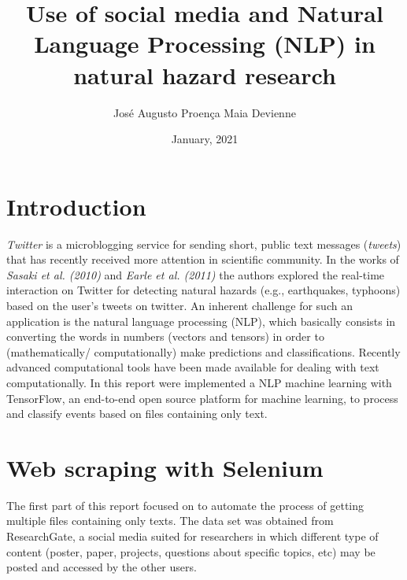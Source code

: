 \documentclass{article}
\title{Use of social media and Natural Language Processing (NLP) in natural hazard research}
\author{José Augusto Proença Maia Devienne}
\affil{Big Data to Earth Scientists}
\date{January, 2021}
\begin{document}
\maketitle

\section{Introduction}

\textit{Twitter} is a microblogging service for sending short, public text messages (\textit{tweets}) that has recently received more attention in scientific community. In the works of \textit{Sasaki et al. (2010)} and \textit{Earle et al. (2011)} the authors explored the real-time interaction on Twitter for detecting natural hazards (e.g., earthquakes, typhoons) based on the user's tweets on twitter. An inherent challenge for such an application is the natural language processing (NLP), which basically consists in converting the words in numbers (vectors and tensors) in order to (mathematically/ computationally) make predictions and classifications. Recently advanced computational tools have been made available for dealing with text computationally. In this report were implemented a NLP machine learning with TensorFlow, an end-to-end open source platform for machine learning,  to process and classify events based on files containing only text. 





\section{Web scraping with Selenium}

The first part of this report focused on to automate the process of getting multiple files containing only texts. The data set was obtained from ResearchGate, a social media suited for researchers in which different type of content (poster, paper, projects, questions about specific topics, etc) may be posted and accessed by the other users. 
\end{document}
